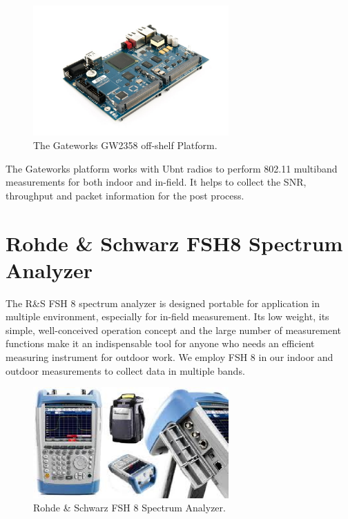 \begin{figure} 
\centering
\includegraphics[width=75mm]{figures/gw2358}
\vspace{-0.1in}
\caption{The Gateworks GW2358 off-shelf Platform.}
\label{fig:gw2358}
\vspace{0.1in}
\end{figure}



The Gateworks platform works with Ubnt radios to perform 802.11 
multiband measurements for both indoor and in-field. It helps to 
collect the SNR, throughput and packet information for the post 
process. 

\section{Rohde \& Schwarz FSH8 Spectrum Analyzer}

The R\&S FSH 8 spectrum analyzer is designed portable for application 
in multiple environment, especially for in-field measurement. Its low 
weight, its simple, well-conceived operation concept and the large number 
of measurement functions make it an indispensable tool for anyone who 
needs an efficient measuring instrument for outdoor work. We employ 
FSH 8 in our indoor and outdoor measurements to collect data in multiple
bands.

\begin{figure} 
\centering
\includegraphics[width=75mm]{figures/fsh8}
\vspace{-0.1in}
\caption{Rohde \& Schwarz FSH 8 Spectrum Analyzer.}
\label{fig:fsh8}
\vspace{0.1in}
\end{figure}

